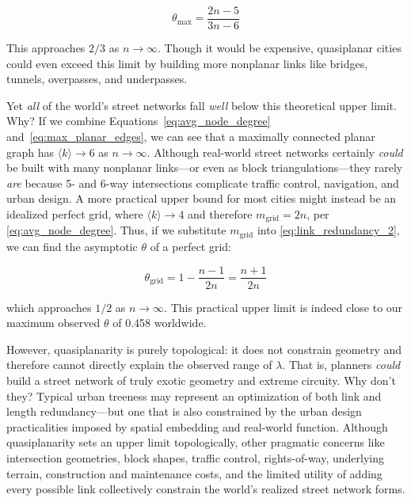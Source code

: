 \documentclass[12pt,letterpaper]{article} %
\begin{document}
\begin{equation}
  \theta_{\text{max}} = \frac{2n - 5}{3n - 6}
\end{equation}

This approaches $2 / 3$ as $n \to \infty$. Though it would be expensive, quasiplanar cities could even exceed this limit by building more nonplanar links like bridges, tunnels, overpasses, and underpasses.

Yet \textit{all} of the world's street networks fall \textit{well} below this theoretical upper limit. Why? If we combine Equations~\ref{eq:avg_node_degree} and~\ref{eq:max_planar_edges}, we can see that a maximally connected planar graph has $\langle k \rangle \to 6$ as $n \to \infty$. Although real-world street networks certainly \textit{could} be built with many nonplanar links---or even as block triangulations---they rarely \textit{are} because 5- and 6-way intersections complicate traffic control, navigation, and urban design. A more practical upper bound for most cities might instead be an idealized perfect grid, where $\langle k \rangle \to 4$ and therefore $m_{\text{grid}} = 2n$, per \autoref{eq:avg_node_degree}. Thus, if we substitute $m_{\text{grid}}$ into \autoref{eq:link_redundancy_2}, we can find the asymptotic $\theta$ of a perfect grid:

\begin{equation}
  \theta_{\text{grid}} = 1 - \frac{n - 1}{2n} = \frac{n + 1}{2n}
\end{equation}

which approaches $1/2$ as $n \to \infty$. This practical upper limit is indeed close to our maximum observed $\theta$ of 0.458 worldwide.

However, quasiplanarity is purely topological: it does not constrain geometry and therefore cannot directly explain the observed range of $\lambda$. That is, planners \textit{could} build a street network of truly exotic geometry and extreme circuity. Why don't they? Typical urban treeness may represent an optimization of both link and length redundancy---but one that is also constrained by the urban design practicalities imposed by spatial embedding and real-world function. Although quasiplanarity sets an upper limit topologically, other pragmatic concerns like intersection geometries, block shapes, traffic control, rights-of-way, underlying terrain, construction and maintenance costs, and the limited utility of adding every possible link collectively constrain the world's realized street network forms.
\end{document}
